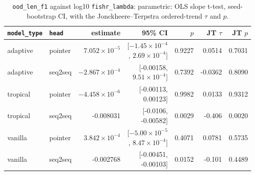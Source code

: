 \documentclass[10pt]{article}
\begin{document}
{\small
\begin{longtable}{llrrrrr}
\caption{\texttt{ood\_len\_f1} against log10 \texttt{fishr\_lambda}: parametric: OLS slope t-test, seed-bootstrap CI, with the Jonckheere--Terpstra ordered-trend $\tau$ and $p$.}\label{tab:trend-ood_len_f1}\\
\toprule
\texttt{model\_type} & \texttt{head} & estimate & 95\% CI & $p$ & JT $\tau$ & JT $p$\\
\midrule
\endhead
adaptive & pointer & $7.052\times10^{-5}$ & [$-1.45\times10^{-4}$, $2.69\times10^{-4}$] & 0.9227 & 0.0514 & 0.7031\\
adaptive & seq2seq & $-2.867\times10^{-4}$ & [-0.00158, $9.51\times10^{-4}$] & 0.7392 & -0.0362 & 0.8090\\
tropical & pointer & $-4.458\times10^{-6}$ & [-0.00113, 0.00123] & 0.9982 & 0.0133 & 0.9312\\
tropical & seq2seq & -0.008031 & [-0.0106, -0.00582] & 0.0029 & -0.406 & 0.0020\\
vanilla & pointer & $3.842\times10^{-4}$ & [$-5.00\times10^{-5}$, $8.47\times10^{-4}$] & 0.4071 & 0.0781 & 0.5735\\
vanilla & seq2seq & -0.002768 & [-0.00451, -0.00103] & 0.0152 & -0.101 & 0.4489\\
\bottomrule
\end{longtable}
}
\end{document}
